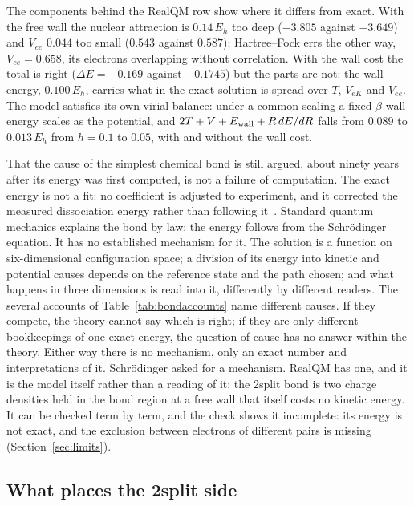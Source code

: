 \documentclass[11pt]{article}
\begin{document}
The components behind the RealQM row show where it differs from exact. With the free wall the nuclear
attraction is $0.14\,E_h$ too deep ($-3.805$ against $-3.649$) and $V_{ee}$ $0.044$ too small ($0.543$ against
$0.587$); Hartree--Fock errs the other way, $V_{ee}=0.658$, its electrons overlapping without correlation.
With the wall cost the total is right ($\Delta E=-0.169$ against $-0.1745$) but the parts are not: the wall
energy, $0.100\,E_h$, carries what in the exact solution is spread over $T$, $V_{eK}$ and $V_{ee}$. The model
satisfies its own virial balance: under a common scaling a fixed-$\beta$ wall energy scales as the potential,
and $2T+V+E_{\rm wall}+R\,dE/dR$ falls from $0.089$ to $0.013\,E_h$ from $h=0.1$ to $0.05$, with and without
the wall cost.

That the cause of the simplest chemical bond is still argued, about ninety years after its energy was
first computed, is not a failure of computation. The exact energy is not a fit: no coefficient is
adjusted to experiment, and it corrected the measured dissociation energy rather than following
it~\cite{kw68,herzberg70}. Standard quantum mechanics explains the bond by law: the energy follows from
the Schr\"odinger equation. It has no established mechanism for it. The solution is a function on
six-dimensional configuration space; a division of its energy into kinetic and potential causes depends
on the reference state and the path chosen; and what happens in three dimensions is read into it,
differently by different readers. The several accounts of Table~\ref{tab:bondaccounts} name different
causes. If they compete, the theory cannot say which is right; if they are only different bookkeepings of
one exact energy, the question of cause has no answer within the theory. Either way there is no
mechanism, only an exact number and interpretations of it. Schr\"odinger asked for a mechanism. RealQM
has one, and it is the model itself rather than a reading of it: the 2split bond is two charge densities
held in the bond region at a free wall that itself costs no kinetic energy. It can be checked term by
term, and the check shows it incomplete: its energy is not exact, and the exclusion between electrons of
different pairs is missing (Section~\ref{sec:limits}).

\subsection{What places the 2split side}
\label{sec:why}
\end{document}
